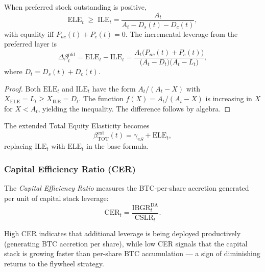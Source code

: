\begin{proposition}\label{prop:ele_ordering}
When preferred stock outstanding is positive,
\begin{equation}\label{eq:ele_vs_ile}
  \mathrm{ELE}_t \;\ge\; \mathrm{ILE}_t
  = \frac{A_t}{A_t - D_s(t) - D_c(t)},
\end{equation}
with equality iff $P_{nc}(t) + P_c(t) = 0$.  The incremental leverage
from the preferred layer is
\begin{equation}\label{eq:ele_increment}
  \Delta\beta_t^{\mathrm{pfd}}
  = \mathrm{ELE}_t - \mathrm{ILE}_t
  = \frac{A_t\bigl(P_{nc}(t) + P_c(t)\bigr)}
         {\bigl(A_t - D_t\bigr)\bigl(A_t - L_t\bigr)},
\end{equation}
where $D_t = D_s(t) + D_c(t)$.
\end{proposition}

\begin{proof}
Both $\mathrm{ELE}_t$ and $\mathrm{ILE}_t$ have the form $A_t/(A_t - X)$
with $X_{\mathrm{ELE}} = L_t \ge X_{\mathrm{ILE}} = D_t$.  The function
$f(X) = A_t/(A_t-X)$ is increasing in $X$ for $X < A_t$, yielding the
inequality.  The difference follows by algebra.
\end{proof}

\noindent The extended Total Equity Elasticity becomes
\begin{equation}\label{eq:tee_ext}
  \beta_{\mathrm{TOT}}^{\mathrm{ext}}(t)
  = \gamma_{\pi S} + \mathrm{ELE}_t,
\end{equation}
replacing $\mathrm{ILE}_t$ with $\mathrm{ELE}_t$ in the base formula.

\subsubsection{Capital Efficiency Ratio (CER)}

\begin{definition}[CER]\label{def:cer}
The \emph{Capital Efficiency Ratio} measures the BTC-per-share accretion
generated per unit of capital stack leverage:
\begin{equation}\label{eq:cer}
  \mathrm{CER}_t
  = \frac{\mathrm{IBGR}_t^{\mathrm{DA}}}{\mathrm{CSLR}_t}.
\end{equation}
\end{definition}

\noindent High CER indicates that additional leverage is being deployed
productively (generating BTC accretion per share), while low CER signals
that the capital stack is growing faster than per-share BTC accumulation
--- a sign of diminishing returns to the flywheel strategy.

